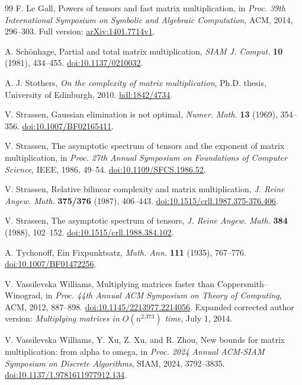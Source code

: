 \documentclass[11pt]{article}
\theoremstyle{definition}
\theoremstyle{remark}
\numberwithin{equation}{section}
\begin{document}
\begin{thebibliography}{99}
F. Le Gall, Powers of tensors and fast matrix multiplication,
in \emph{Proc. 39th International Symposium on Symbolic and Algebraic
Computation}, ACM, 2014, 296--303.
Full version: \href{https://arxiv.org/abs/1401.7714v1}{arXiv:1401.7714v1}.

A. Sch\"onhage, Partial and total matrix multiplication,
\emph{SIAM J. Comput.} \textbf{10} (1981), 434--455.
\href{https://doi.org/10.1137/0210032}{doi:10.1137/0210032}.

A. J. Stothers, \emph{On the complexity of matrix multiplication},
Ph.D. thesis, University of Edinburgh, 2010.
\href{https://hdl.handle.net/1842/4734}{hdl:1842/4734}.

V. Strassen, Gaussian elimination is not optimal,
\emph{Numer. Math.} \textbf{13} (1969), 354--356.
\href{https://doi.org/10.1007/BF02165411}{doi:10.1007/BF02165411}.

V. Strassen, The asymptotic spectrum of tensors and the exponent of
matrix multiplication, in \emph{Proc. 27th Annual Symposium on
Foundations of Computer Science}, IEEE, 1986, 49--54.
\href{https://doi.org/10.1109/SFCS.1986.52}{doi:10.1109/SFCS.1986.52}.

V. Strassen, Relative bilinear complexity and matrix multiplication,
\emph{J. Reine Angew. Math.} \textbf{375/376} (1987), 406--443.
\href{https://doi.org/10.1515/crll.1987.375-376.406}{doi:10.1515/crll.1987.375-376.406}.

V. Strassen, The asymptotic spectrum of tensors,
\emph{J. Reine Angew. Math.} \textbf{384} (1988), 102--152.
\href{https://doi.org/10.1515/crll.1988.384.102}{doi:10.1515/crll.1988.384.102}.

A. Tychonoff, Ein Fixpunktsatz,
\emph{Math. Ann.} \textbf{111} (1935), 767--776.
\href{https://doi.org/10.1007/BF01472256}{doi:10.1007/BF01472256}.

V. Vassilevska Williams, Multiplying matrices faster than
Coppersmith--Winograd, in \emph{Proc. 44th Annual ACM Symposium
on Theory of Computing}, ACM, 2012, 887--898.
\href{https://doi.org/10.1145/2213977.2214056}{doi:10.1145/2213977.2214056}.
Expanded corrected author version: \emph{Multiplying matrices in
$O(n^{2.373})$ time}, July 1, 2014.

V. Vassilevska Williams, Y. Xu, Z. Xu, and R. Zhou,
New bounds for matrix multiplication: from alpha to omega,
in \emph{Proc. 2024 Annual ACM-SIAM Symposium on Discrete Algorithms},
SIAM, 2024, 3792--3835.
\href{https://doi.org/10.1137/1.9781611977912.134}{doi:10.1137/1.9781611977912.134}.

\end{thebibliography}
\end{document}

